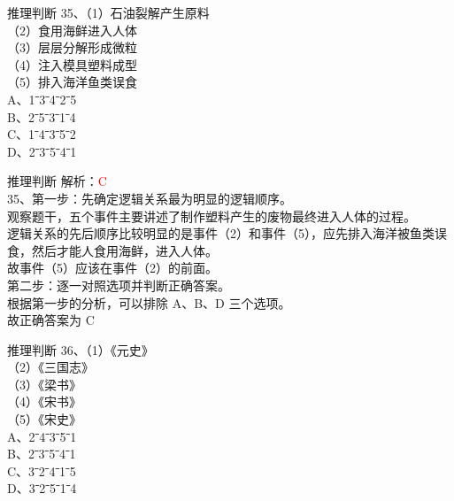 \documentclass[aspectratio=169]{beamer}
\begin{document}
\begin{frame}[t]{推理判断}
    35、（1）石油裂解产生原料\\
    （2）食用海鲜进入人体\\
    （3）层层分解形成微粒\\
    （4）注入模具塑料成型\\
    （5）排入海洋鱼类误食\\
    A、1ˉ3ˉ4ˉ2ˉ5\\
    B、2ˉ5ˉ3ˉ1ˉ4\\
    C、1ˉ4ˉ3ˉ5ˉ2\\
    D、2ˉ3ˉ5ˉ4ˉ1\\
\end{frame}

\begin{frame}[t]{推理判断}
    解析：\textcolor{red}{C}\\
    35、第一步：先确定逻辑关系最为明显的逻辑顺序。\\
    观察题干，五个事件主要讲述了制作塑料产生的废物最终进入人体的过程。\\
    逻辑关系的先后顺序比较明显的是事件（2）和事件（5），应先排入海洋被鱼类误食，然后才能人食用海鲜，进入人体。\\
    故事件（5）应该在事件（2）的前面。\\
    第二步：逐一对照选项并判断正确答案。\\
    根据第一步的分析，可以排除 A、B、D 三个选项。\\
    故正确答案为 C\\
\end{frame}


\begin{frame}[t]{推理判断}
    36、（1）《元史》\\
    （2）《三国志》\\
    （3）《梁书》\\
    （4）《宋书》\\
    （5）《宋史》\\
    A、2ˉ4ˉ3ˉ5ˉ1\\
    B、2ˉ3ˉ5ˉ4ˉ1\\
    C、3ˉ2ˉ4ˉ1ˉ5\\
    D、3ˉ2ˉ5ˉ1ˉ4\\
\end{frame}
\end{document}
